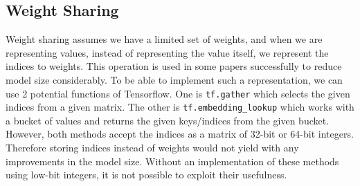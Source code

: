 \subsection{Weight Sharing}
Weight sharing assumes we have a limited set of weights, and when we are representing values, instead of representing the value itself, we represent the indices to weights. This operation is used in some papers successfully to reduce model size considerably. To be able to implement such a representation, we can use 2 potential functions of Tensorflow. One is \texttt{tf.gather} which selects the given indices from a given matrix. The other is \texttt{tf.embedding\_lookup} which works with a bucket of values and returns the given keys/indices from the given bucket. However, both methods accept the indices as a matrix of 32-bit or 64-bit integers. Therefore storing indices instead of weights would not yield with any improvements in the model size. Without an implementation of these methods using low-bit integers, it is not possible to exploit their usefulness.























